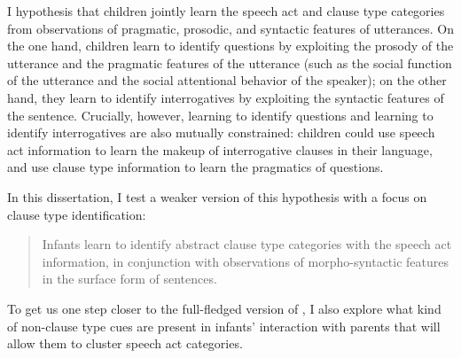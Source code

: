 I hypothesis that children jointly learn the speech act and clause type categories from observations of pragmatic, prosodic, and syntactic features of utterances. On the one hand, children learn to identify questions by exploiting the prosody of the utterance and the pragmatic features of the utterance (such as the social function of the utterance and the social attentional behavior of the speaker); on the other hand, they learn to identify interrogatives by exploiting the syntactic features of the sentence. Crucially, however, learning to identify questions and learning to identify interrogatives are also mutually constrained: children could use speech act information to learn the makeup of interrogative clauses in their language, and use clause type information to learn the pragmatics of questions. 

In this dissertation, I test a weaker version of this hypothesis with a focus on clause type identification:

\begin{quote}
Infants learn to identify abstract clause type categories with the speech act information, in conjunction with observations of morpho-syntactic features in the surface form of sentences.
\end{quote}


To get us one step closer to the full-fledged version of \hypos{}, I also explore what kind of non-clause type cues are present in infants' interaction with parents that will allow them to cluster speech act categories. 

